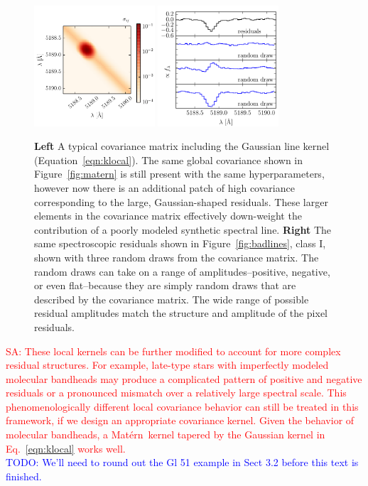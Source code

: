 \documentclass[iop,floatfix]{emulateapj}
\newcommand{\matern}{Mat\'{e}rn}
\newcommand{\todo}[1]{ \textcolor{blue}{\\TODO: #1}}
\newcommand{\comm}[1]{ \textcolor{red}{SA: #1}}
\begin{document}
\begin{figure}[!t]
\begin{center}
\includegraphics[width=0.4\textwidth]{figs/gauss_matrix.pdf}
\includegraphics[width=0.4\textwidth]{figs/gauss_draw.pdf}
\caption{\textbf{Left} A typical covariance matrix including the Gaussian line kernel (Equation~\ref{eqn:klocal}). The same global covariance shown in Figure~\ref{fig:matern} is still present with the same hyperparameters, however now there is an additional patch of high covariance corresponding to the large, Gaussian-shaped residuals. These larger elements in the covariance matrix effectively down-weight the contribution of a poorly modeled synthetic spectral line.
\textbf{Right} The same spectroscopic residuals shown in Figure~\ref{fig:badlines}, class I, shown with three random draws from the covariance matrix. The random draws can take on a range of amplitudes--positive, negative, or even flat--because they are simply random draws that are described by the covariance matrix. The wide range of possible residual amplitudes match the structure and amplitude of the pixel residuals.}
\label{fig:region}
\end{center}
\end{figure}

\comm{These local kernels can be further modified to account for more complex residual structures.  For 
example, late-type stars with imperfectly modeled molecular bandheads may produce a complicated 
pattern of positive and negative residuals or a pronounced mismatch over a relatively large 
spectral scale.  This phenomenologically different local covariance behavior can still be treated 
in this framework, if we design an appropriate covariance kernel. Given the behavior of molecular bandheads, a \matern\ kernel tapered by the Gaussian kernel in Eq.~\ref{eqn:klocal} works well.}
\todo{We'll need to round out the Gl 51 example in Sect 3.2 before this text is finished.}
\end{document}
